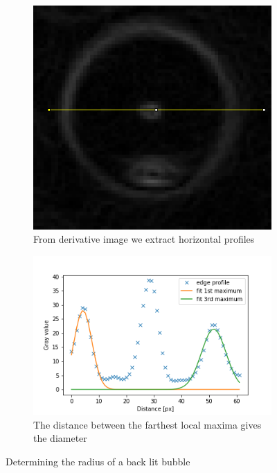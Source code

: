 			\begin{figure}
				\centering

				\begin{subfigure}[t]{.5\textwidth}
					\centering
					\includegraphics[scale=0.3]{images/green_edges.png}
					\caption{From derivative image we extract horizontal profiles}
				\end{subfigure}
								
				\begin{subfigure}[t]{.5\textwidth}
				\centering
					\includegraphics[scale=0.5]{graphs/green_radius_demo.png}
					\caption{The distance between the farthest local maxima gives the diameter}
				\end{subfigure}
				
				\caption{Determining the radius of a back lit bubble}								
				\label{fig:green_radius}
			\end{figure}
			
